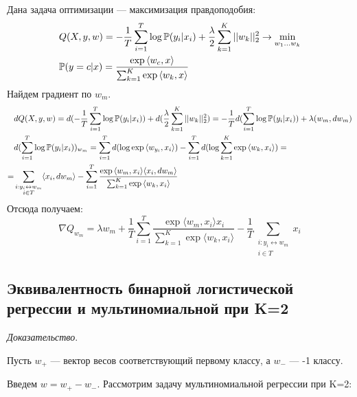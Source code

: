 \documentclass[12pt,fleqn]{article}
\begin{document}
Дана задача оптимизации --- максимизация правдоподобия:
\begin{align}
    \notag & Q(X,y,w) = -\frac{1}{T}\sum_{i=1}^{T}\log\mathbb{P}(y_i|x_i)+
    \frac{\lambda}{2}\sum_{k=1}^{K}||w_k||_2^2 \rightarrow \min_{w_1\dots w_k} \\
    \notag & \mathbb{P}(y=c|x) = \frac{\exp{\langle w_c,x \rangle}}{\sum_{k=1}^{K}\exp{\langle w_k,x \rangle}}
\end{align}
Найдем градиент по $w_m$.
\begin{align}
    \notag & dQ(X,y,w) = d(-\frac{1}{T}\sum_{i=1}^{T}\log\mathbb{P}(y_i|x_i)) + d(\frac{\lambda}{2}\sum_{k=1}^{K}||w_k||_2^2) =
    -\frac{1}{T}d(\sum_{i=1}^{T}\log\mathbb{P}(y_i|x_i)) + \lambda(w_m,dw_m) \\
    \notag & d(\sum_{i=1}^{T}\log\mathbb{P}(y_i|x_i))_{w_m} = \sum_{i=1}^{T}d(\log\exp{\langle w_{y_i}, x_i \rangle})-
    \sum_{i=1}^{T}d(\log \sum_{k=1}^{K}\exp{\langle w_k, x_i \rangle}) = \\
    \notag =&\sum_{\substack{i:y_i \leftrightarrow w_m \\ i\in T}}\langle x_i,dw_m \rangle - 
    \sum_{i=1}^{T}\frac{\exp{\langle w_m,x_i\rangle}\langle x_i,dw_m \rangle}{\sum_{k=1}^{K}\exp{\langle w_k, x_i \rangle}}
\end{align}
Отсюда получаем: 
$$
\nabla Q_{w_m} =\lambda w_m + \frac{1}{T}\sum_{i=1}^{T}
\frac{\exp{\langle w_m,x_i\rangle}x_i}{\sum_{k=1}^{K}\exp{\langle w_k, x_i \rangle}}-
\frac{1}{T}\sum_{\substack{i:y_i \leftrightarrow w_m \\ i\in T}}x_i 
$$
\subsection{Эквивалентность бинарной логистической регрессии и мультиномиальной при K=2}
\noindent \textit{Доказательство}.

\noindent Пусть $w_{+}$ --- вектор весов соответствующий первому классу, а $w_{-}$ --- -1 классу.

\noindent Введем $w = w_{+}-w_{-}$.
\noindent Рассмотрим задачу мультиномиальной регрессии при K=2:
\end{document}
